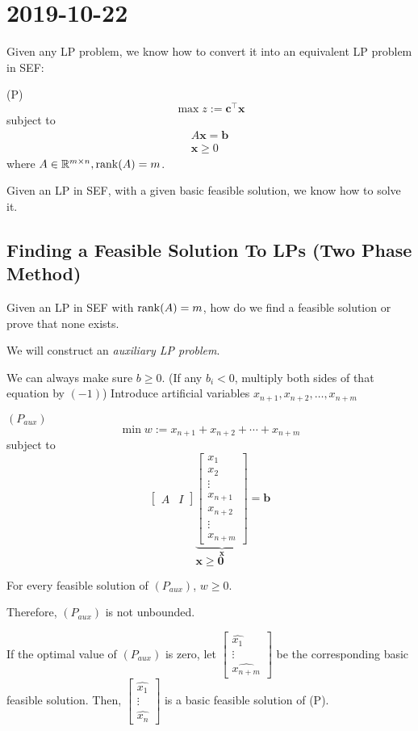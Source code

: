 \section{2019-10-22}
Given any LP problem, we know how to convert it into an equivalent LP
problem in SEF:

(P)
\[\max z:=\bm{c}^\top \bm{x}\]
subject to
\begin{align*}
    A \bm{x}=\bm{b}\\
    \bm{x}\ge 0
\end{align*}
where $ A\in\mathbb{R}^{m\times n}, \operatorname{rank}(A)=m $.

Given an LP in SEF, with a given basic feasible solution, we know
how to solve it.

\subsection{Finding a Feasible Solution To LPs (Two Phase Method)}
Given an LP in SEF with $ \operatorname{rank}(A)=m $, how do we find a feasible
solution or prove that none exists.

We will construct an \emph{auxiliary LP problem}.

We can always make sure $ b\ge 0 $. (If any $ b_i<0 $, multiply both
sides of that equation by $ (-1) $) Introduce artificial variables
$ x_{n+1},x_{n+2},\ldots,x_{n+m} $

$ (P_{aux}) $
\[ \min w:=x_{n+1}+x_{n+2}+\cdots+x_{n+m} \]
subject to
\[
    \left[\begin{array}{c|c}
        A & I
    \end{array}\right]
    \underbrace{\left[\begin{array}{c}
        x_1\\
        x_2\\
        \vdots\\
        x_{n+1}\\
        x_{n+2}\\
        \vdots\\
        x_{n+m}
    \end{array}\right]}_{\bm{x}}
    =\bm{b}\]
\[ \bm{x} \ge \bm{0}\]

For every feasible solution of $ (P_{aux}) $, $ w\ge 0 $.

Therefore, $ (P_{aux}) $ is not unbounded.

If the optimal value of $ (P_{aux}) $ is zero, let
$ 
\begin{bmatrix}
    \hat{x_1}\\
    \vdots\\
    \hat{x_{n+m}}
\end{bmatrix}
$ 
be the corresponding basic feasible solution. Then, 
$ 
\begin{bmatrix}
    \hat{x_1}\\
    \vdots\\
    \hat{x_{n}}
\end{bmatrix}
$
is a basic feasible solution of (P).

